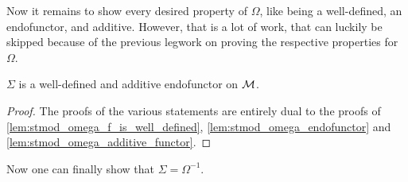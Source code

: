 Now it remains to show every desired property of \( \Omega \), like being a well-defined, an endofunctor, and additive. However, that is a lot of work, that can luckily be skipped because of the previous legwork on proving the respective properties for \( \Omega \).

\begin{lemma}
    \label{lem:stmod_sigma_well-defined_additive_endofunctor}
    \( \Sigma \) is a well-defined and additive endofunctor on \( {\mathcal{M}} \).
\end{lemma}
\begin{proof}
    The proofs of the various statements are entirely dual to the proofs of \autoref{lem:stmod_omega_f_is_well_defined}, \autoref{lem:stmod_omega_endofunctor} and \autoref{lem:stmod_omega_additive_functor}.
\end{proof}

Now one can finally show that \( \Sigma = \Omega^{-1} \).

